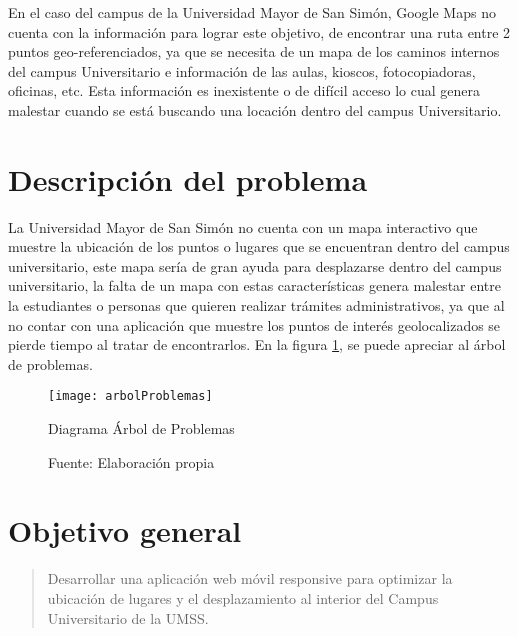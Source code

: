   En el caso del campus de la Universidad Mayor de San Simón, Google Maps no cuenta con la información para lograr este objetivo, de encontrar una ruta entre 2 puntos geo-referenciados, ya que se necesita de un mapa de los caminos internos del campus Universitario e información de las aulas, kioscos, fotocopiadoras, oficinas, etc. Esta información es inexistente o de difícil acceso lo cual genera malestar cuando se está buscando una locación dentro del campus Universitario.



  \section{Descripción del problema} %
  \label{sec:desc_probl}
  La Universidad Mayor de San Simón no cuenta con un mapa interactivo que
  muestre la ubicación de los puntos o lugares que se encuentran dentro del
  campus universitario, este mapa sería de gran ayuda para desplazarse dentro
  del campus universitario, la falta de un mapa con estas características
  genera malestar entre la estudiantes o personas que quieren realizar trámites
  administrativos, ya que al no contar con una aplicación que muestre los puntos de interés  geolocalizados se pierde tiempo al tratar de encontrarlos.
  En la figura \ref{fig:arbolProblemas}, se puede apreciar al árbol de problemas.



  \begin{figure}[H]
    \begin{center}
      \texttt{[image: arbolProblemas]}
    \end{center}
    \caption{Diagrama Árbol de Problemas}
    \label{fig:arbolProblemas}
    \caption*{Fuente: Elaboración propia}
  \end{figure}

  \section{Objetivo general} %
  \label{sec:objetivo_general}
    \begin{quote}
      Desarrollar una aplicación web móvil responsive para optimizar la ubicación de lugares y el  desplazamiento al interior del Campus Universitario de la UMSS.
    \end{quote}



